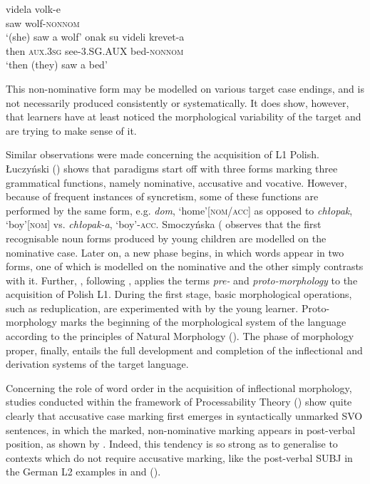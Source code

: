 \ea%
    \label{ex:01:4}
    \ea
    \label{ex:01:4a}
    \gll    videla volk-e\\
            saw  wolf-\textsc{nonnom}\\
    \glt    ‘(she) saw a wolf’
    \ex
    \label{ex:01:4b}
    \gll    onak su videli krevet-a\\
            then  \textsc{aux.3sg}  see-\textsc{3.SG.AUX}  bed-\textsc{nonnom}\\
    \glt    ‘then (they) saw a bed’
    \z
\z

This non-nominative form may be modelled on various target case endings, and is not necessarily produced consistently or systematically. It does show, however, that learners have at least noticed the morphological variability of the target and are trying to make sense of it.

Similar observations were made concerning the acquisition of L1 Polish. Łuczyński (\citeyear{Łuczyński2002, Łuczyński2004, Łuczyński2010}) shows that paradigms start off with three forms marking three grammatical functions, namely nominative, accusative and vocative. However, because of frequent instances of syncretism, some of these functions are performed by the same form, e.g. \textit{dom}, ‘home’\textsc{[nom/acc]} as opposed to \textit{chłopak}, ‘boy’\textsc{[nom]} vs. \textit{chłopak-a}, ‘boy’-\textsc{acc}. Smoczyńska (\citeyear{Smoczyńska1972, Smoczyńska1985, Smoczyńska1997} observes that the first recognisable noun forms produced by young children are modelled on the nominative case. Later on, a new phase begins, in which words appear in two forms, one of which is modelled on the nominative and the other simply contrasts with it. Further, \citet{Dziubalska-Kołaczyk1997}, following \citet{DresslerKarpf1994}, applies the terms \textit{pre-} and \textit{proto-morphology} to the acquisition of Polish L1. During the first stage, basic morphological operations, such as reduplication, are experimented with by the young learner. Proto-morphology marks the beginning of the morphological system of the language according to the principles of Natural Morphology (\citealt{Dressler1985, Dressler1987, Dressler2011, Wurzel1989, Crocco-Galeas1998}). The phase of morphology proper, finally, entails the full development and completion of the inflectional and derivation systems of the target language.

Concerning the role of word order in the acquisition of inflectional morphology, studies conducted within the framework of Processability Theory (\citealt{Pienemann1998, Pienemann2015, Di-BiaseBettoni2015}) show quite clearly that accusative case marking first emerges in syntactically unmarked SVO sentences, in which the marked, non-nominative marking appears in post-verbal position, as shown by  \citet[190]{ArtoniMagnani2015} . Indeed, this tendency is so strong as to generalise to contexts which do not require accusative marking, like the post-verbal SUBJ in the German L2 examples in  \citep[490]{Baten2011} and  (\citealt[235]{DiehlEtAl2000}).

